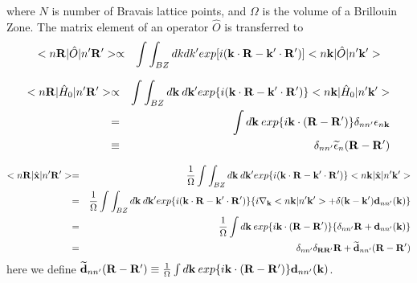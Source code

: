 \documentclass[aps,prb,preprint]{revtex4-1}
\begin{document}
\begin{appendix}
where $N$ is number of Bravais lattice points, and $\Omega$ is the volume of a Brillouin Zone. 
The matrix element of an operator $\hat{O}$ is transferred to 
\begin{eqnarray}
 < n{\bf R}| \hat{O} |n'{\bf R'}> \propto && \int \int_{BZ} dk dk' exp[i ({\bf k} \cdot {\bf R}- {\bf k'} \cdot {\bf R'} ) ]< n{\bf k}| \hat{O} |n'{\bf k'}>  
\end{eqnarray} 

\begin{eqnarray}
 < n{\bf R}| \hat{H}_0 |n'{\bf R'}> \propto && \int \int_{BZ} d{\bf k} \:d{\bf k'} exp\{i ({\bf k} \cdot {\bf R}- {\bf k'} \cdot {\bf R'} ) \}< n{\bf k}| \hat{H}_0 |n'{\bf k'}>  \nonumber \\
= && \int d{\bf k} \: exp\{i{\bf k} \cdot ({\bf R- R'} ) \} \delta_{nn'} \epsilon_{n{\bf k}} \\
\equiv && \delta_{nn'} \widetilde{\epsilon}_{n}({\bf R- R'} )  \\
\end{eqnarray} 

\begin{eqnarray}
 < n{\bf R}| \hat{\bf x} |n'{\bf R'}> = && \frac{1}{\Omega} \int \int_{BZ} d{\bf k} \:d{\bf k'} exp\{i ({\bf k} \cdot {\bf R}- {\bf k'} \cdot {\bf R'} ) \}< n{\bf k}| \hat{\bf x} |n'{\bf k'}>  \nonumber \\
= &&\frac{1}{\Omega}  \int \int_{BZ} d{\bf k} \:d{\bf k'} exp\{i ({\bf k} \cdot {\bf R}- {\bf k'} \cdot {\bf R'} ) \} \{ i \nabla_{\bf k} <n{\bf k}|n'{\bf k'}> + \delta({\bf k-k'}) {\bf d}_{nn'}({\bf k}) \} \nonumber \\
= &&\frac{1}{\Omega} \int d{\bf k} \: exp\{i{\bf k} \cdot ({\bf R- R'} ) \}\{ \delta_{nn'} {\bf R}  + {\bf d}_{nn'}({\bf k}) \} \\
= && \delta_{nn'} \delta_{\bf RR'} {\bf R}  + {\bf \widetilde d}_{nn'}({\bf R-R'})  \\
\end{eqnarray} 
here we define ${\bf \widetilde d}_{nn'}({\bf R-R'}) \equiv \frac{1}{\Omega} \int d{\bf k} \: exp\{i{\bf k} \cdot ({\bf R- R'} ) \}{\bf d}_{nn'}({\bf k})$.


\end{appendix}
\end{document}

